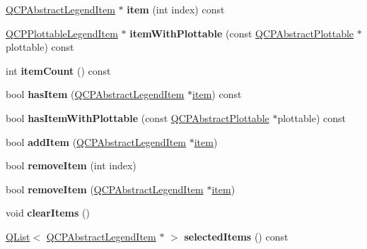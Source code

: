 \begin{DoxyCompactItemize}
\item 
\mbox{\label{class_q_c_p_legend_a4496cc7a136a25597e086eacf14f2bbe}} 
\hyperlink{class_q_c_p_abstract_legend_item}{Q\+C\+P\+Abstract\+Legend\+Item} $\ast$ {\bfseries item} (int index) const
\item 
\mbox{\label{class_q_c_p_legend_ae90e0864491e98d09171792c2718bba9}} 
\hyperlink{class_q_c_p_plottable_legend_item}{Q\+C\+P\+Plottable\+Legend\+Item} $\ast$ {\bfseries item\+With\+Plottable} (const \hyperlink{class_q_c_p_abstract_plottable}{Q\+C\+P\+Abstract\+Plottable} $\ast$plottable) const
\item 
\mbox{\label{class_q_c_p_legend_a57ab86ab8b2a3762d4c1455eb5452c88}} 
int {\bfseries item\+Count} () const
\item 
\mbox{\label{class_q_c_p_legend_ad0f698e33db454a6c103b5206740e599}} 
bool {\bfseries has\+Item} (\hyperlink{class_q_c_p_abstract_legend_item}{Q\+C\+P\+Abstract\+Legend\+Item} $\ast$\hyperlink{class_q_c_p_legend_acfe9694c45104a3359d3806ed366fcf7}{item}) const
\item 
\mbox{\label{class_q_c_p_legend_a4b90a442af871582df85c2bc13f91e88}} 
bool {\bfseries has\+Item\+With\+Plottable} (const \hyperlink{class_q_c_p_abstract_plottable}{Q\+C\+P\+Abstract\+Plottable} $\ast$plottable) const
\item 
\mbox{\label{class_q_c_p_legend_a3ab274de52d2951faea45a6d975e6b3f}} 
bool {\bfseries add\+Item} (\hyperlink{class_q_c_p_abstract_legend_item}{Q\+C\+P\+Abstract\+Legend\+Item} $\ast$\hyperlink{class_q_c_p_legend_acfe9694c45104a3359d3806ed366fcf7}{item})
\item 
\mbox{\label{class_q_c_p_legend_ac91595c3eaa746fe6321d2eb952c63bb}} 
bool {\bfseries remove\+Item} (int index)
\item 
\mbox{\label{class_q_c_p_legend_a2aea4ec6da2d454dd0b241a254d65082}} 
bool {\bfseries remove\+Item} (\hyperlink{class_q_c_p_abstract_legend_item}{Q\+C\+P\+Abstract\+Legend\+Item} $\ast$\hyperlink{class_q_c_p_legend_acfe9694c45104a3359d3806ed366fcf7}{item})
\item 
\mbox{\label{class_q_c_p_legend_a24795c7250eb5214fcea16b7217b4dfb}} 
void {\bfseries clear\+Items} ()
\item 
\mbox{\label{class_q_c_p_legend_af98e87f8d246fd2aa1310ce73cbb7d61}} 
\hyperlink{class_q_list}{Q\+List}$<$ \hyperlink{class_q_c_p_abstract_legend_item}{Q\+C\+P\+Abstract\+Legend\+Item} $\ast$ $>$ {\bfseries selected\+Items} () const
\end{DoxyCompactItemize}
